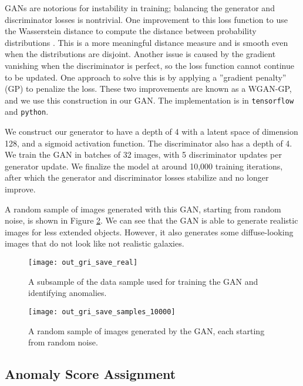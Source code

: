 \documentclass[fleqn,usenatbib,useAMS]{mnras}
\begin{document}
GANs are notorious for instability in training; balancing the generator and discriminator losses is nontrivial.
One improvement to this loss function to use the Wasserstein distance to compute the distance between probability distributions \citep{Arjovsky2017}.
This is a more meaningful distance measure and is smooth even when the distributions are disjoint. 
Another issue is caused by the gradient vanishing when the discriminator is perfect, so the loss function cannot continue to be updated.
One approach to solve this is by applying a ''gradient penalty'' (GP) to penalize the loss.
These two improvements are known as a WGAN-GP, and we use this construction in our GAN.
The implementation is in \texttt{tensorflow} and \texttt{python}.

We construct our generator to have a depth of 4 with a latent space of dimension 128, and a sigmoid activation function.
The discriminator also has a depth of 4.
We train the GAN in batches of 32 images, with 5 discriminator updates per generator update.
We finalize the model at around 10,000 training iterations, after which the generator and discriminator losses stabilize and no longer improve.

A random sample of images generated with this GAN, starting from random noise, is shown in Figure \ref{fig:gen}.
We can see that the GAN is able to generate realistic images for less extended objects.
However, it also generates some diffuse-looking images that do not look like not realistic galaxies.

\begin{figure}

    \centering
    \texttt{[image: out\_gri\_save\_real]}
    \caption{A subsample of the data sample used for training the GAN and identifying anomalies.}
    \label{fig:real}
\end{figure}

\begin{figure}
    \centering
    \texttt{[image: out\_gri\_save\_samples\_10000]}
    \caption{A random sample of images generated by the GAN, each starting from random noise.}
    \label{fig:gen}
\end{figure}

\subsection{Anomaly Score Assignment}
\label{sec:sanom_assignment}
\end{document}
